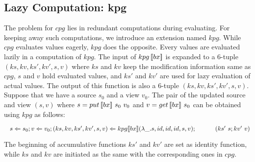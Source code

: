 


\subsection{Lazy Computation: kpg}

The problem for $cpg$ lies in redundant computations during evaluating. For keeping away such computations, we introduce an extension named $kpg$. While $cpg$ evaluates values eagerly, $kpg$ does the opposite. Every values are evaluated lazily in a computation of $kpg$. The input of $kpg \, [\![bx]\!]$ is expanded to a 6-tuple $(ks, kv, ks', kv', s, v)$ where $ks$ and $kv$ keep the modification information same as $cpg$, $s$ and $v$ hold evaluated values, and $ks'$ and $kv'$ are used for lazy evaluation of actual values. The output of this function is also a 6-tuple $(ks, kv, ks', kv', s, v)$.\\
Suppose that we have a source $s_0$ and a view $v_0$. The pair of the updated source and view $(s, v)$ where $s = put \, [\![bx]\!] \ s_0 \ v_0$ and $v = get \, [\![bx]\!] \ s_0$ can be obtained using $kpg$ as follows:

\smallvspace
    $\tab s \Leftarrow s_0; v \Leftarrow v_0; (ks, kv, ks', kv', s, v) \Leftarrow \kpg{bx}{\lambda \_.s}{id}{id}{id}{s}{v};\\
        \tab \qtab (ks' \ s; kv' \ v)$
\smallvspace
        
The beginning of accumulative functions $ks'$ and $kv'$ are set as identity function, while $ks$ and $kv$ are initiated as the same with the corresponding ones in $cpg$.

